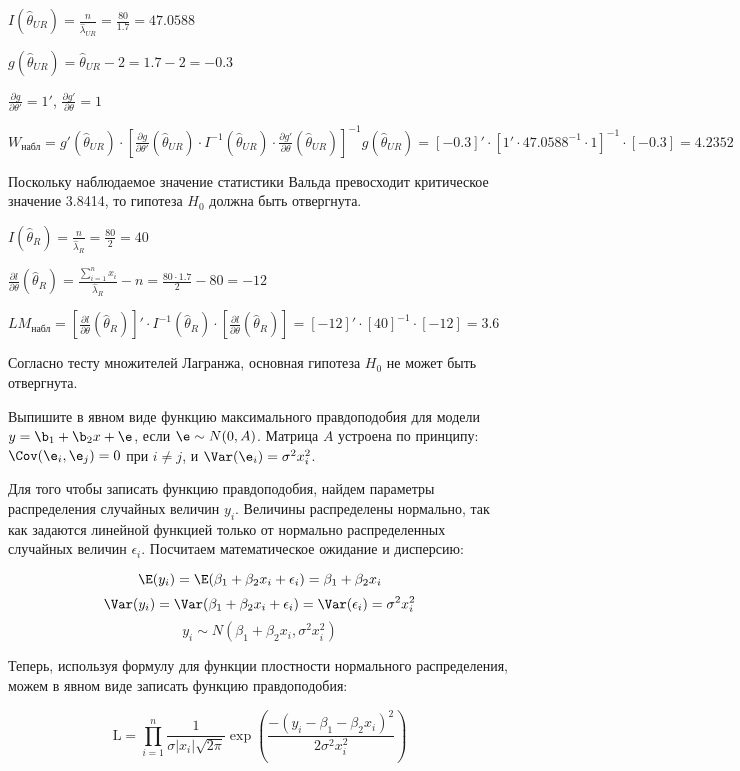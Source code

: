 \documentclass[pdftex,11pt,openany]{book}\usepackage[]{graphicx}\usepackage[]{color}
\begin{document}
\begin{solution}
$I(\hat{\theta}_{UR}) = \frac{n}{\hat{\lambda}_{UR}} = \frac{80}{1.7} = 47.0588$

$g(\hat{\theta}_{UR}) = \hat{\theta}_{UR} - 2 = 1.7 - 2 = -0.3$

$\frac{\partial g}{\partial \theta'} = 1'$, $\frac{\partial g'}{\partial \theta} = 1$

$W_{\text{набл}} = g'(\hat{\theta}_{UR}) \cdot \left[ \frac{\partial g}{\partial \theta'}(\hat{\theta}_{UR}) \cdot I^{-1}(\hat{\theta}_{UR}) \cdot \frac{\partial g'}{\partial \theta}(\hat{\theta}_{UR}) \right]^{-1} g(\hat{\theta}_{UR}) = [-0.3]' \cdot [1' \cdot 47.0588^{-1} \cdot 1]^{-1} \cdot [-0.3] = 4.2352$

Поскольку наблюдаемое значение статистики Вальда превосходит критическое значение 3.8414, то гипотеза $H_0$ должна быть отвергнута.

$I(\hat{\theta}_{R}) = \frac{n}{\hat{\lambda}_{R}} = \frac{80}{2} = 40$

$\frac{\partial l}{\partial \theta}(\hat{\theta}_R) = \frac{\sum_{i=1}^n x_i}{\hat{\lambda}_R} - n = \frac{80 \cdot 1.7}{2} - 80 = -12$

$LM_{\text{набл}} = \left[ \frac{\partial l}{\partial \theta}(\hat{\theta}_{R}) \right]' \cdot I^{-1}(\hat{\theta}_{R}) \cdot \left[ \frac{\partial l}{\partial \theta}(\hat{\theta}_{R}) \right] = [-12]' \cdot [40]^{-1} \cdot [-12] = 3.6$

Согласно тесту множителей Лагранжа, основная гипотеза $H_0$ не может быть отвергнута.
\end{solution}



\begin{problem}
Выпишите в явном виде функцию максимального правдоподобия для модели $y=\b_1+\b_2 x+\e$, если $\e\sim N(0,A)$.
Матрица $A$ устроена по принципу: $\Cov(\e_i,\e_j)=0$ при $i\neq j$, и $\Var(\e_i)=\sigma^2 x_i^2$.
\end{problem}

\begin{solution}
Для того чтобы записать функцию правдоподобия, найдем параметры распределения случайных величин $y_i$. Величины распределены нормально, так как задаются линейной функцией только от нормально распределенных случайных величин $\epsilon_i$. Посчитаем математическое ожидание и дисперсию:

\[\E(y_i) = \E(\beta_1 + \beta_2x_i + \epsilon_i) = \beta_1 + \beta_2x_i\]
\[\Var(y_i)= \Var(\beta_1 + \beta_2x_i + \epsilon_i) = \Var(\epsilon_i) = \sigma^2x_i^2\]
\[y_i \sim N(\beta_1 + \beta_2x_i, \sigma^2x_i^2)\]

Теперь, используя формулу для функции плостности нормального распределения, можем в явном виде записать функцию правдоподобия:

\[\text{L} = \prod_{i=1}^{n} \frac{1}{\sigma |x_i|\sqrt{2\pi}}\exp\left( \frac{-(y_i - \beta_1 - \beta_2x_i)^2}{2\sigma^2x_i^2}\right) \]

\end{solution}
\end{document}
